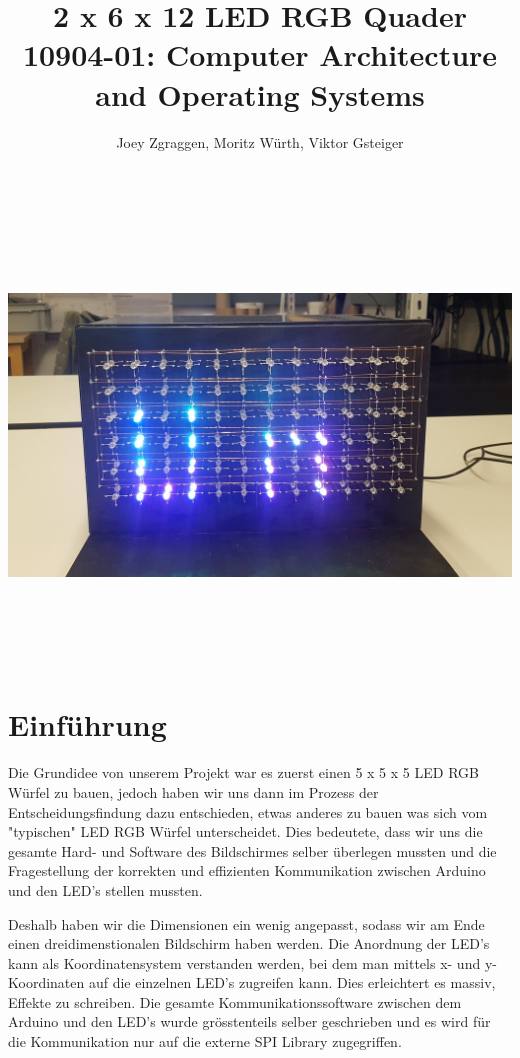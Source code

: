 \documentclass[12pt,a4paper]{article}
\title{\textbf{2 x 6 x 12 LED RGB Quader} \\ \small{10904-01: Computer Architecture and Operating Systems}}
\author{Joey Zgraggen, Moritz Würth, Viktor Gsteiger}
\begin{document}
\renewcommand\contentsname{Inhaltsverzeichnis}
\begin{titlepage}
\maketitle
\begin{center}
    \includegraphics[width=16cm,height=12cm]{Endprod2.jpg}
\end{center}
\end{titlepage}
\tableofcontents
\newpage

\section{Einführung}

Die Grundidee von unserem Projekt war es zuerst einen 5 x 5 x 5 LED RGB Würfel zu bauen, jedoch haben wir uns dann im Prozess der Entscheidungsfindung
dazu entschieden, etwas anderes zu bauen was sich vom "typischen" LED RGB Würfel unterscheidet. Dies bedeutete, dass wir uns die gesamte Hard- und Software des Bildschirmes selber überlegen mussten und die Fragestellung der korrekten und effizienten Kommunikation zwischen Arduino und den LED's stellen mussten.

Deshalb haben wir die Dimensionen ein wenig angepasst, sodass wir am Ende einen dreidimenstionalen Bildschirm haben werden. Die Anordnung der LED's kann als Koordinatensystem verstanden werden, bei dem man mittels x- und y-Koordinaten auf die einzelnen LED's zugreifen kann. Dies erleichtert es massiv, Effekte zu schreiben. Die gesamte Kommunikationssoftware zwischen dem Arduino und den LED's wurde grösstenteils selber geschrieben und es wird für die Kommunikation nur auf die externe SPI Library zugegriffen\cite{SPI}.
\end{document}
